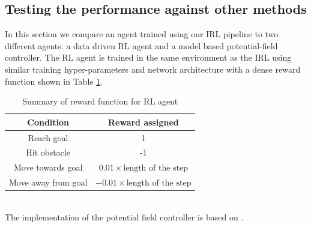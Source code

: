 \subsection*{Testing the performance against other methods}
In this section we compare an agent trained using our IRL pipeline to two different agents: a data driven RL agent and a model based potential-field controller. The RL agent is trained in the same environment as the IRL using similar training hyper-parameters and network architecture with a dense reward function shown in Table  \ref{tab:reward-function-summarization}.
\begin{table}[htbp]
    \caption{Summary of reward function for RL agent}
    \begin{center}
        \renewcommand{\arraystretch}{1.3}
        \begin{tabular}{|c|c|}
        \hline
        Condition & Reward assigned \\
        \hline
        Reach goal & 1 \\
        Hit obstacle & -1 \\
        Move towards goal & $0.01 \times \text{length of the step}$ \\
        Move away from goal & $ -0.01 \times \text{length of the step}$\\
        \hline
        \end{tabular}
    \end{center}
    \label{tab:reward-function-summarization}
\end{table}\\
The implementation of the potential field controller is based on \cite{khatib-potential-field}.\\  
